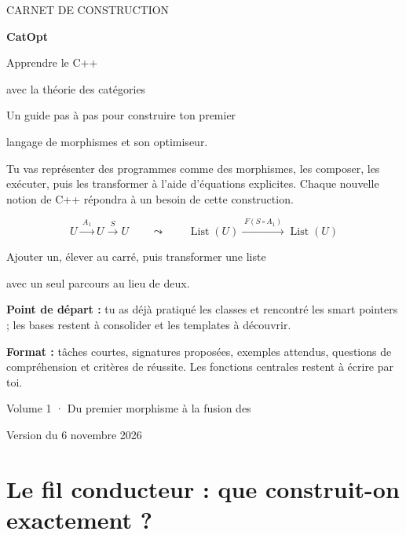 \documentclass[11pt,a4paper]{article}
\newcommand{\code}[1]{\texttt{\detokenize{#1}}}
\newcommand{\List}{\operatorname{List}}
\begin{document}
\hypersetup{pageanchor=false}
\begin{titlepage}
\vspace*{13mm}
{\color{accent}\large CARNET DE CONSTRUCTION}\par
\vspace{9mm}
{\color{ink}\fontsize{46}{50}\selectfont\bfseries CatOpt}\par
\vspace{5mm}
{\color{ink}\LARGE Apprendre le C++\par avec la théorie des catégories}\par
\vspace{8mm}
{\large Un guide pas à pas pour construire ton premier\par langage de morphismes et son optimiseur.}
\vspace{13mm}

\begin{objectif}
Tu vas représenter des programmes comme des morphismes, les composer,
les exécuter, puis les transformer à l'aide d'équations explicites.
Chaque nouvelle notion de C++ répondra à un besoin de cette construction.
\end{objectif}

\vspace{6mm}
\[
 U \xrightarrow{\;A_1\;} U \xrightarrow{\;S\;} U
 \qquad\leadsto\qquad
 \List(U)\xrightarrow{\;F(S\circ A_1)\;}\List(U)
\]
\begin{center}
\color{muted}Ajouter un, élever au carré, puis transformer une liste\par
avec un seul parcours au lieu de deux.
\end{center}

\vfill
\textbf{Point de départ :} tu as déjà pratiqué les classes et rencontré les
smart pointers ; les bases restent à consolider et les templates à découvrir.

\textbf{Format :} tâches courtes, signatures proposées, exemples attendus,
questions de compréhension et critères de réussite. Les fonctions centrales
restent à écrire par toi.

\vspace{5mm}
{\small\color{muted}Volume 1 · Du premier morphisme à la fusion des \code{map}\par
Version du 6 novembre 2026}
\end{titlepage}

\hypersetup{pageanchor=true}
\tableofcontents
\clearpage
{}
\section{Le fil conducteur : que construit-on exactement ?}
\end{document}
